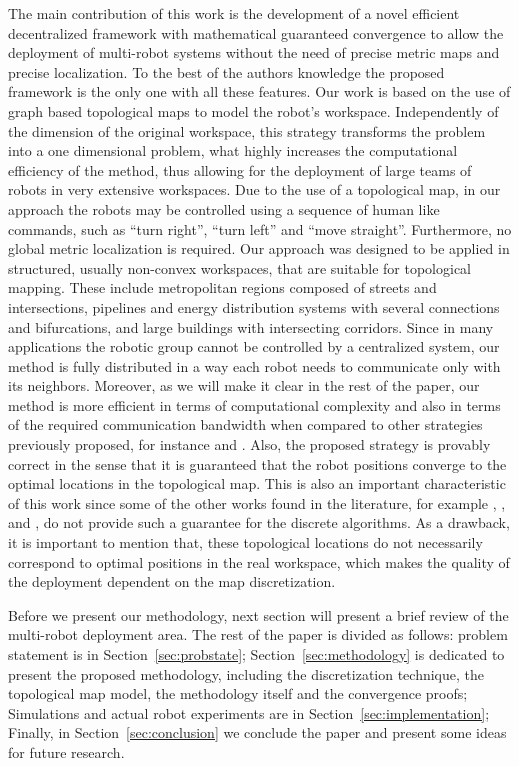 \documentclass[smallcondensed]{svjour3}
\begin{document}
{\color{blue} The main contribution of this work is the development of a novel efficient decentralized framework with mathematical guaranteed convergence to allow the deployment of multi-robot systems without the need of precise metric maps and precise localization. To the best of the authors knowledge the proposed framework is the only one with all these features. Our work is based on the use of graph based topological maps to model the robot's workspace. Independently of the dimension of the original workspace, this strategy transforms the problem into a one dimensional problem, what highly increases the computational efficiency of the method, thus allowing for the deployment of large teams of robots in very extensive workspaces. Due to the use of a topological map, in our approach the robots may be controlled using a sequence of human like commands, such as ``turn right'', ``turn left'' and ``move straight''. Furthermore, no global metric localization is required. Our approach  was designed to be applied in structured, usually non-convex workspaces, that are suitable for topological mapping. These include metropolitan regions composed of streets and intersections, pi\-pe\-lines and energy distribution systems with several connections and bifurcations, and large buildings with intersecting corridors. Since in many applications the robotic group cannot be controlled by a centralized system, our method is fully distributed 
in a way each robot needs to communicate only with its neighbors. Moreover, as we will make it clear in the rest of the paper, our method is more efficient in terms of computational complexity and also in terms of the required communication bandwidth when compared to other strategies previously proposed, for instance \cite{Durham2012} and \cite{Yun2013}. Also, the proposed strategy is provably correct in the sense that it is guaranteed that the robot positions converge to the optimal locations in the topological map. This is also an important characteristic of this work since some of the other works found in the literature, for example \cite{Bhattacharya2013a}, \cite{Bhattacharya2013IJRR}, and \cite{reza2014}, do not provide such a guarantee for the discrete algorithms. As a drawback, it is important to mention that, these topological locations do not necessarily correspond to optimal positions in the real workspace, which makes the quality of the deployment dependent on the map discretization.}

Before we present our methodology, next section will present a brief review of the multi-robot deployment area. The rest of the paper is divided as follows: problem statement is in Section~\ref{sec:probstate}; Section~\ref{sec:methodology} is dedicated to present the proposed methodology, including the discretization technique, the topological map model, the methodology itself and the convergence proofs; Simulations and actual robot experiments are in Section~\ref{sec:implementation}; Finally, in Section~\ref{sec:conclusion} we conclude the paper and present some ideas for future research.
\end{document}
